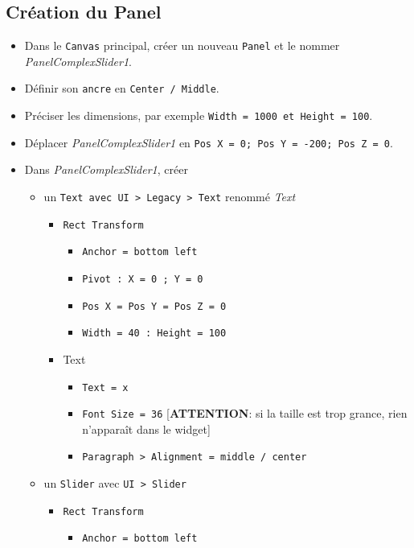 \documentclass[a4paper,10pt]{article}
\newenvironment{solution}%
{\begin{tcolorbox}[breakable,colback=red!5!white,colframe=red!75!black,title=Solution]}%
{\end{tcolorbox}}
\begin{document}
\ifversionenseignant
\begin{solution}
\subsection{Création du Panel}
\begin{itemize}
	\item Dans le \texttt{Canvas} principal, créer un nouveau \texttt{Panel} et le nommer \textit{PanelComplexSlider1}. 
	\item Définir son \texttt{ancre} en \texttt{Center / Middle}.
	\item  Préciser les dimensions, par exemple \texttt{Width = 1000 et Height = 100}. \item Déplacer \textit{PanelComplexSlider1} en \texttt{Pos X = 0; Pos Y = -200; Pos Z = 0}.	
	\item Dans \textit{PanelComplexSlider1}, créer
	\begin{itemize}
		\item un  \texttt{Text avec UI > Legacy > Text} renommé \textit{Text}
		\begin{itemize}
			\item \texttt{Rect Transform}
			\begin{itemize}
				\item \texttt{Anchor = bottom left}
				\item \texttt{Pivot : X = 0 ; Y = 0}
				\item \texttt{Pos X = Pos Y = Pos Z = 0}
				\item \texttt{Width = 40 : Height = 100}				
			\end{itemize}
		    \item Text
		    \begin{itemize}
		    	\item \texttt{Text = x}
		    	\item \texttt{Font Size = 36} [\textbf{ATTENTION}: si la taille est trop grance, rien n'apparaît dans le widget]
		    	\item \texttt{Paragraph > Alignment = middle / center}
		    \end{itemize}
		\end{itemize}
		\item un \texttt{Slider} avec \texttt{UI > Slider}
		\begin{itemize}
			\item \texttt{Rect Transform}
			\begin{itemize}
				\item \texttt{Anchor = bottom left}

\end{itemize}
\end{itemize}
\end{itemize}
\end{itemize}
\end{solution}
\end{document}
